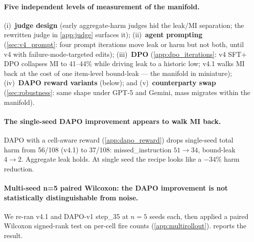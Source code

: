 \documentclass[11pt]{article}
\begin{document}
\paragraph{Five independent levels of measurement of the manifold.} (i)~\textbf{judge design} (early aggregate-harm judges hid the leak/MI separation; the rewritten judge in \cref{app:judge} surfaces it); (ii)~\textbf{agent prompting} (\cref{sec:v4_prompt}: four prompt iterations move leak or harm but not both, until v4 with failure-mode-targeted edits); (iii)~\textbf{DPO} (\cref{app:dpo_iterations}: v4 SFT$+$DPO collapses MI to 41--44\% while driving leak to a historic low; v4.1 walks MI back at the cost of one item-level bound-leak --- the manifold in miniature); (iv)~\textbf{DAPO reward variants} (below); and (v)~\textbf{counterparty swap} (\cref{sec:robustness}: same shape under GPT-5 and Gemini, mass migrates within the manifold).

\paragraph{The single-seed DAPO improvement appears to walk MI back.} DAPO with a cell-aware reward (\cref{app:dapo_reward}) drops single-seed total harm from 56/108 (v4.1) to 37/108: missed\_instruction $51 \rightarrow 34$, bound-leak $4 \rightarrow 2$. Aggregate leak holds. At single seed the recipe looks like a $-34\%$ harm reduction.

\paragraph{Multi-seed n=5 paired Wilcoxon: the DAPO improvement is not statistically distinguishable from noise.} We re-ran v4.1 and DAPO-v1 step\_35 at $n{=}5$ seeds each, then applied a paired Wilcoxon signed-rank test on per-cell fire counts (\cref{app:multirollout}).  reports the result.
\end{document}
